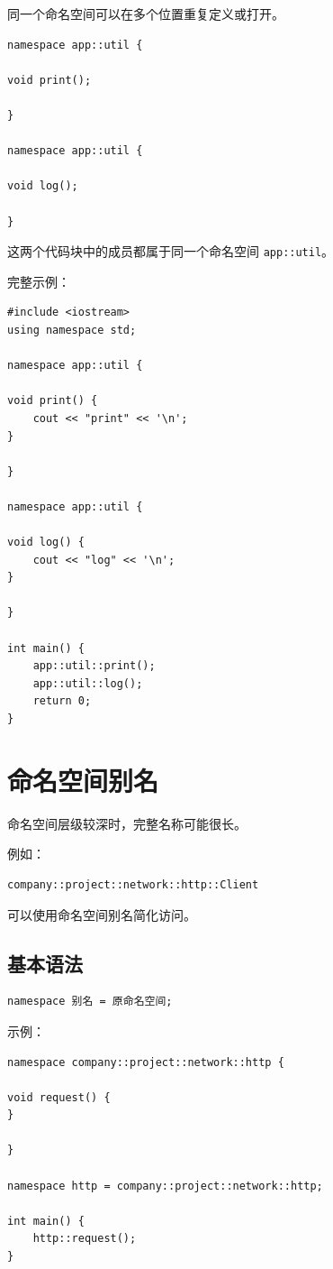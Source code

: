 \documentclass[UTF8,12pt,a4paper]{ctexart}
\begin{document}
同一个命名空间可以在多个位置重复定义或打开。

\begin{lstlisting}
namespace app::util {

void print();

}

namespace app::util {

void log();

}
\end{lstlisting}

这两个代码块中的成员都属于同一个命名空间 \texttt{app::util}。

完整示例：

\begin{lstlisting}
#include <iostream>
using namespace std;

namespace app::util {

void print() {
    cout << "print" << '\n';
}

}

namespace app::util {

void log() {
    cout << "log" << '\n';
}

}

int main() {
    app::util::print();
    app::util::log();
    return 0;
}
\end{lstlisting}

\section{命名空间别名}

命名空间层级较深时，完整名称可能很长。

例如：

\begin{lstlisting}
company::project::network::http::Client
\end{lstlisting}

可以使用命名空间别名简化访问。

\subsection{基本语法}

\begin{lstlisting}
namespace 别名 = 原命名空间;
\end{lstlisting}

示例：

\begin{lstlisting}
namespace company::project::network::http {

void request() {
}

}

namespace http = company::project::network::http;

int main() {
    http::request();
}
\end{lstlisting}
\end{document}
